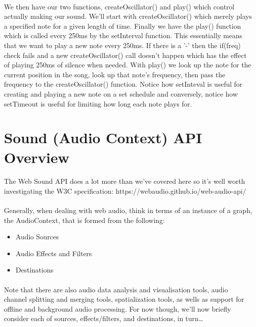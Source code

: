 \paragraph{} We then have our two functions, createOscillator() and play() which control actually making our sound. We'll start with createOscillator() which merely plays a specified note for a given length of time. Finally we have the play() function which is called every 250ms by the setInterval function. This essentially means that we want to play a new note every 250ms. If there is a '-' then the if(freq) check fails and a new createOscillator() call doesn't happen which has the effect of playing 250ms of silence when needed. With play() we look up the note for the current position in the song, look up that note's frequency, then pass the frequency to the createOscillator() function. Notice how setInteval is useful for creating and playing a new note on a set schedule and conversely, notice how setTimeout is useful for limiting how long each note plays for.


\section{Sound (Audio Context) API Overview}
\paragraph{} The Web Sound API  does a lot more than we've covered here so it's well worth investigating the W3C specification:
https://webaudio.github.io/web-audio-api/

\paragraph{} Generally, when dealing with web audio, think in terms of an instance of a graph, the AudioContext,  that is formed from the following:

\begin{itemize}
\item Audio Sources
\item Audio Effects and Filters
\item Destinations
\end{itemize}

\paragraph{} Note that there are also audio data analysis and visualisation tools, audio channel splitting and merging tools, spatialization tools, as wells as support for offline and background audio processing. For now though, we'll now briefly consider each of sources, effects/filters, and destinations, in turn\dots


